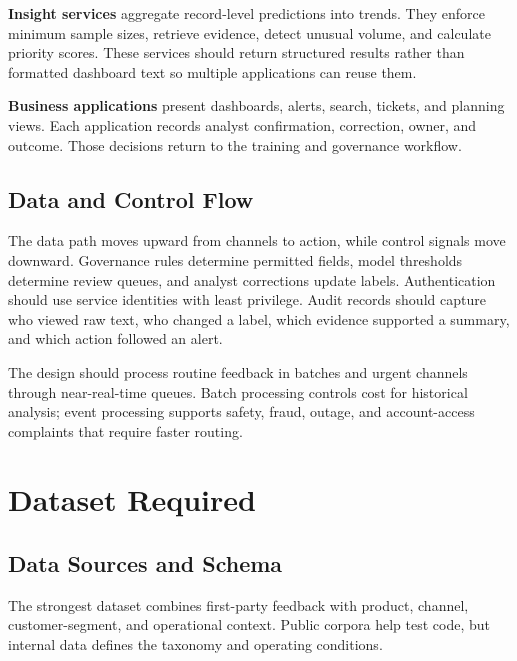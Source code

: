 \documentclass[11pt,a4paper,twoside]{article}
\begin{document}
\textbf{Insight services} aggregate record-level predictions into trends. They enforce minimum sample sizes, retrieve evidence, detect unusual volume, and calculate priority scores. These services should return structured results rather than formatted dashboard text so multiple applications can reuse them.

\textbf{Business applications} present dashboards, alerts, search, tickets, and planning views. Each application records analyst confirmation, correction, owner, and outcome. Those decisions return to the training and governance workflow.

\subsection{Data and Control Flow}

The data path moves upward from channels to action, while control signals move downward. Governance rules determine permitted fields, model thresholds determine review queues, and analyst corrections update labels. Authentication should use service identities with least privilege. Audit records should capture who viewed raw text, who changed a label, which evidence supported a summary, and which action followed an alert.

The design should process routine feedback in batches and urgent channels through near-real-time queues. Batch processing controls cost for historical analysis; event processing supports safety, fraud, outage, and account-access complaints that require faster routing.

\newpage

\section{Dataset Required}

\subsection{Data Sources and Schema}

The strongest dataset combines first-party feedback with product, channel, customer-segment, and operational context. Public corpora help test code, but internal data defines the taxonomy and operating conditions.
\end{document}
